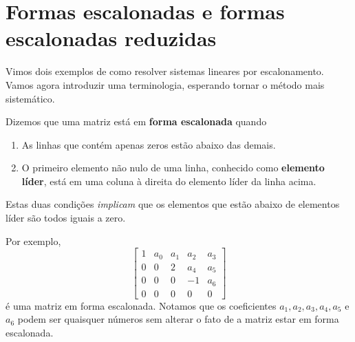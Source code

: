 \section{Formas escalonadas e formas escalonadas reduzidas}


Vimos dois exemplos de como resolver sistemas lineares por escalonamento. Vamos agora introduzir uma terminologia, esperando tornar o método mais sistemático.

Dizemos que uma matriz está em \textbf{forma escalonada} quando
\begin{enumerate}
  \item As linhas que contém apenas zeros estão abaixo das demais.
  \item O primeiro elemento não nulo de uma linha, conhecido como \textbf{elemento líder}, está em uma coluna à direita do elemento líder da linha acima.
\end{enumerate} Estas duas condições \emph{implicam} que os elementos que estão abaixo de elementos líder são todos iguais a zero.

Por exemplo,
\begin{equation}\label{escalonada1}
\left[
\begin{array}{ccccc}
1 & a_0 & a_1 & a_2 & a_3 \\
0 & 0 & 2 & a_4 & a_5 \\
0 & 0 & 0 & -1 & a_6 \\
0 & 0 & 0 & 0 & 0
\end{array}
\right]
\end{equation} é uma matriz em forma escalonada. Notamos que os coeficientes $a_1, a_2, a_3, a_4, a_5$ e $a_6$ podem ser quaisquer números sem alterar o fato de a matriz estar em forma escalonada.

